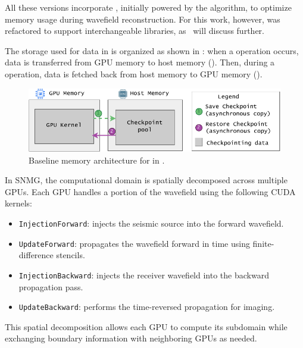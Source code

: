 \documentclass[Ingles,Final]{ic-tese-v3}
\begin{document}
All these versions incorporate \checkpointing, initially powered by the \revolve algorithm, to optimize memory usage during wavefield reconstruction. For this work, however, \awave was refactored to support interchangeable \checkpointing libraries, as~ will discuss further.

The storage used for \checkpointing data in \awave is organized as shown in : when a \save {} operation occurs, data is transferred from GPU memory to host memory (\dth). Then, during a \restore {} operation, data is fetched back from host memory to GPU memory (\htd).

\begin{figure}[h!]
    \centering
    \includegraphics[width=1\linewidth,clip]{figures/arch_baseline.pdf}
    \caption[\awave baseline memory architecture diagram]{Baseline memory architecture for \checkpointing in \awave.}%
    \label{fig:baseline}
\end{figure}

In SNMG, the computational domain is spatially decomposed across multiple GPUs. Each GPU handles a portion of the wavefield using the following CUDA kernels:
\begin{itemize}
  \item \texttt{InjectionForward}: injects the seismic source into the forward wavefield.
  \item \texttt{UpdateForward}: propagates the wavefield forward in time using finite-difference stencils.
  \item \texttt{InjectionBackward}: injects the receiver wavefield into the backward propagation pass.
  \item \texttt{UpdateBackward}: performs the time-reversed propagation for imaging.
\end{itemize}
This spatial decomposition allows each GPU to compute its subdomain while exchanging boundary information with neighboring GPUs as needed.
\end{document}
